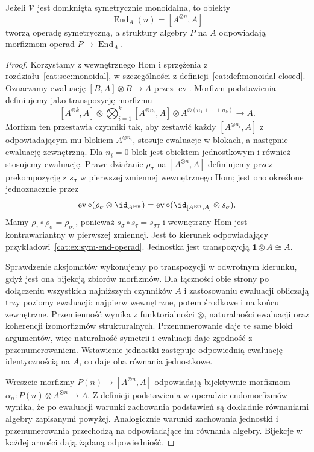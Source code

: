 \begin{stwierdzenie}\label{cat:prop:internal-end-operad}
Jeżeli $\mathcal V$ jest domknięta symetrycznie monoidalna, to obiekty
\[
 \operatorname{End}_A(n)=[A^{\otimes n},A]
\]
tworzą operadę symetryczną, a struktury algebry $P$ na $A$ odpowiadają morfizmom operad $P\to\operatorname{End}_A$.
\end{stwierdzenie}
\begin{proof}
Korzystamy z wewnętrznego Hom i sprzężenia z rozdziału~\ref{cat:sec:monoidal}, w szczególności z definicji~\ref{cat:def:monoidal-closed}. Oznaczamy ewaluację $[B,A]\otimes B\to A$ przez $\operatorname{ev}$. Morfizm podstawienia definiujemy jako transpozycję morfizmu
\[
 [A^{\otimes k},A]\otimes
 \bigotimes_{i=1}^{k}[A^{\otimes n_i},A]\otimes
 A^{\otimes(n_1+\cdots+n_k)}\longrightarrow A.
\]
Morfizm ten przestawia czynniki tak, aby zestawić każdy $[A^{\otimes n_i},A]$ z odpowiadającym mu blokiem $A^{\otimes n_i}$, stosuje ewaluacje w blokach, a następnie ewaluację zewnętrzną. Dla $n_i=0$ blok jest obiektem jednostkowym i również stosujemy ewaluację. Prawe działanie $\rho_\sigma$ na $[A^{\otimes n},A]$ definiujemy przez prekompozycję z $s_\sigma$ w pierwszej zmiennej wewnętrznego Hom; jest ono określone jednoznacznie przez
\[
 \operatorname{ev}\circ(\rho_\sigma\otimes\id_{A^{\otimes n}})
 =\operatorname{ev}\circ(\id_{[A^{\otimes n},A]}\otimes s_\sigma).
\]
Mamy $\rho_\tau\circ\rho_\sigma=\rho_{\sigma\tau}$, ponieważ $s_\sigma\circ s_\tau=s_{\sigma\tau}$ i wewnętrzny Hom jest kontrawariantny w pierwszej zmiennej. Jest to kierunek odpowiadający przykładowi~\ref{cat:ex:sym-end-operad}. Jednostka jest transpozycją $\mathbf 1\otimes A\cong A$.

Sprawdzenie aksjomatów wykonujemy po transpozycji w odwrotnym kierunku, gdyż jest ona bijekcją zbiorów morfizmów. Dla łączności obie strony po dołączeniu wszystkich najniższych czynników $A$ i zastosowaniu ewaluacji obliczają trzy poziomy ewaluacji: najpierw wewnętrzne, potem środkowe i na końcu zewnętrzne. Przemienność wynika z funktorialności $\otimes$, naturalności ewaluacji oraz koherencji izomorfizmów strukturalnych. Przenumerowanie daje te same bloki argumentów, więc naturalność symetrii i ewaluacji daje zgodność z przenumerowaniem. Wstawienie jednostki zastępuje odpowiednią ewaluację identycznością na $A$, co daje oba równania jednostkowe.

Wreszcie morfizmy $P(n)\to[A^{\otimes n},A]$ odpowiadają bijektywnie morfizmom $\alpha_n:P(n)\otimes A^{\otimes n}\to A$. Z definicji podstawienia w operadzie endomorfizmów wynika, że po ewaluacji warunki zachowania podstawień są dokładnie równaniami algebry zapisanymi powyżej. Analogicznie warunki zachowania jednostki i przenumerowania przechodzą na odpowiadające im równania algebry. Bijekcje w każdej arności dają żądaną odpowiedniość.
\end{proof}

